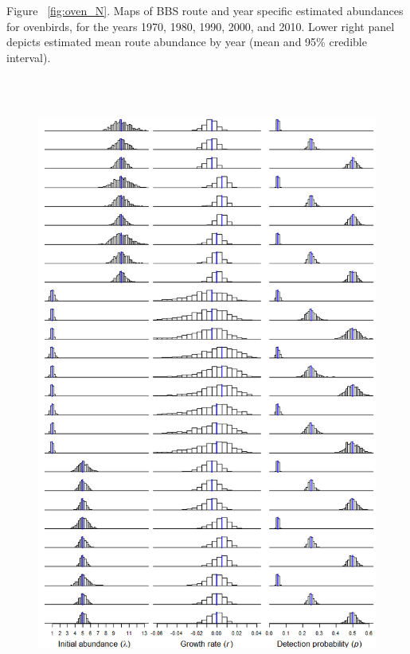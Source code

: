 \documentclass[12pt,english]{article}
\begin{document}
\begin{spacing}{1.9}
\begin{flushleft}
\noindent Figure ~\ref{fig:oven_N}. Maps of BBS route and year specific estimated 
abundances for ovenbirds, for the years 1970, 1980, 1990, 2000, and 2010.  
Lower right panel depicts estimated mean route abundance by year
(mean and 95\% credible interval).

\begin{figure}
\caption{}
  \centering
  \includegraphics[height=8in]{figs/exp_hists}
\label{fig:exp_hists}
\end{figure}


\end{flushleft}
\end{spacing}
\end{document}
